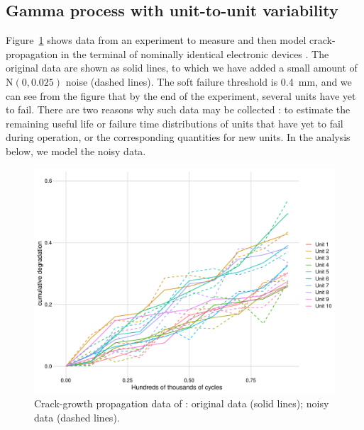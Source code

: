 \documentclass{article}
\begin{document}
\subsection{Gamma process with unit-to-unit variability}
\label{subsec:gprocess_var}

Figure~\ref{fig:RP_w_noise} shows data from an experiment to measure and then model crack-propagation in the terminal of nominally identical electronic devices \citep{rodriguez-picon_degradation_2018}. The original data are shown as solid lines, to which we have added a small amount of $\mathrm{N}(0, 0.025)$ noise (dashed lines). The soft failure threshold is 0.4~mm, and we can see from the figure that by the end of the experiment, several units have yet to fail. There are two reasons why such data may be collected \citep{robinson_bayesian_2000}: to estimate the remaining useful life or failure time distributions of units that have yet to fail during operation, or the corresponding quantities for new units. In the analysis below, we model the noisy data.

\begin{figure}[t]
    \centering
    \includegraphics[width=0.8\columnwidth]{../figures/RP_w_noise.pdf}
    \caption{Crack-growth propagation data of \citet{rodriguez-picon_degradation_2018}: original data (solid lines); noisy data (dashed lines).}
    \label{fig:RP_w_noise}
\end{figure}
\end{document}
